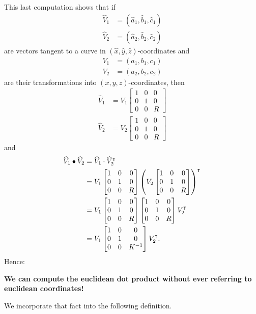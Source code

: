\documentclass{ximera}
\begin{document}
This last computation shows that if
\begin{align*}
\hat{V}_{1}  &  =\left(  \hat{a}_{1},\hat{b}_{1},\hat{c}_{1}\right) \\
\hat{V}_{2}  &  =\left(  \hat{a}_{2},\hat{b}_{2},\hat{c}_{2}\right)
\end{align*}
are vectors tangent to a curve in $(\hat{x},\hat{y},\hat{z})$-coordinates and
\begin{align*}
V_{1}  &  =\left(  a_{1},b_{1},c_{1}\right) \\
V_{2}  &  =\left(  a_{2},b_{2},c_{2}\right)
\end{align*}
are their transformations into $(x,y,z)$-coordinates, then
\begin{align*}
\hat{V}_{1}  &  =V_{1}
\begin{bmatrix}
1 & 0 & 0\\
0 & 1 & 0\\
0 & 0 & R
\end{bmatrix}
 \\
\hat{V}_{2}  &  =V_{2} 
\begin{bmatrix}
1 & 0 & 0\\
0 & 1 & 0\\
0 & 0 & R
\end{bmatrix}
\end{align*}
and%
\begin{align*}
\hat{V}_{1}\bullet\hat{V}_{2} &= \hat{V}_{1}\cdot \hat{V}_{2}^\transpose\\
&=V_{1}
\begin{bmatrix}
1 & 0 & 0\\
0 & 1 & 0\\
0 & 0 & R
\end{bmatrix}
\left(V_{2}
\begin{bmatrix}
1 & 0 & 0\\
0 & 1 & 0\\
0 & 0 & R
\end{bmatrix}\right)^\transpose\\
&=V_{1}
\begin{bmatrix}
1 & 0 & 0\\
0 & 1 & 0\\
0 & 0 & R
\end{bmatrix}
\begin{bmatrix}
1 & 0 & 0\\
0 & 1 & 0\\
0 & 0 & R
\end{bmatrix}
V_{2}^\transpose\\
&=V_{1}
\begin{bmatrix}
1 & 0 & 0\\
0 & 1 & 0\\
0 & 0 & K^{-1}%
\end{bmatrix}
V_{2}^\transpose.
\end{align*}
Hence:
\begin{center}
\textbf{We can compute the euclidean dot product without ever referring to euclidean coordinates!}
\end{center}
We incorporate that fact into the following definition.
\end{document}
